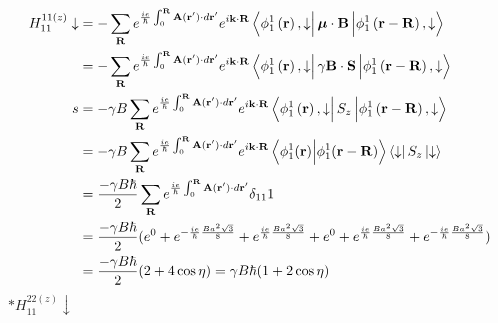 \documentclass{report}
\newcommand{\f}[2]{\dfrac{#1}{#2}}
\begin{document}
\begin{align*}
	H_{11}^{11(z)} \downarrow & = - \sum_{\mathbf{R}} e^{\frac{ie}{\hbar}\int_0^{\mathbf{R}}\mathbf{A}(\mathbf{r'})\cdot d\mathbf{r'}}e^{i\mathbf{k\cdot R}} \bra{\phi^{1}_{1} \left(\mathbf{r}\right), \downarrow} \boldsymbol{\mu}\cdot \mathbf{B} \ket{\phi^{1}_{1} \left(\mathbf{r - R}\right) ,\downarrow} \\
	                          & = - \sum_{\mathbf{R}} e^{\frac{ie}{\hbar}\int_0^{\mathbf{R}}\mathbf{A}(\mathbf{r'})\cdot d\mathbf{r'}}e^{i\mathbf{k\cdot R}} \bra{\phi^{1}_{1} \left(\mathbf{r}\right) ,\downarrow} \gamma \mathbf{B}\cdot\mathbf{S} \ket{\phi^{1}_{1} \left(\mathbf{r - R}\right) ,\downarrow} \\s
	                          & = -\gamma B \sum_{\mathbf{R}} e^{\frac{ie}{\hbar}\int_0^{\mathbf{R}}\mathbf{A}(\mathbf{r'})\cdot d\mathbf{r'}}e^{i\mathbf{k\cdot R}} \bra{\phi^{1}_{1} \left(\mathbf{r}\right) ,\downarrow} S_z \ket{\phi^{1}_{1} \left(\mathbf{r-R}\right) ,\downarrow}                        \\
	                          & = -\gamma B \sum_{\mathbf{R}} e^{\frac{ie}{\hbar}\int_0^{\mathbf{R}}\mathbf{A}(\mathbf{r'})\cdot d\mathbf{r'}}e^{i\mathbf{k\cdot R}} \bra{\phi_{1}^{1}(\mathbf{r})} \ket{\phi_{1}^{1}(\mathbf{r-R}) }\bra{\downarrow}S_z\ket{\downarrow}                                        \\
	                          & = \f{ -\gamma B\hbar}{2} \sum_{\mathbf{R}} e^{\frac{ie}{\hbar}\int_0^{\mathbf{R}}\mathbf{A}(\mathbf{r'})\cdot d\mathbf{r'}} \delta_{11} 1                                                                                                                                       \\
	                          & = \f{ -\gamma B\hbar}{2} (e^{0} + e^{-\frac{ie}{\hbar}\frac{Ba^2\sqrt{3}}{8}} + e^{\frac{ie}{\hbar}\frac{Ba^2\sqrt{3}}{8}} + e^{0} +
	e^{\frac{ie}{\hbar}\frac{Ba^2\sqrt{3}}{8}}
	+ e^{-\frac{ie}{\hbar}\frac{Ba^2\sqrt{3}}{8}} )                                                                                                                                                                                                                                                             \\
	                          & = \f{-\gamma B\hbar}{2} (2 + 4\cos\eta)  = \gamma B\hbar(1+2\cos\eta)
\end{align*}
$\ast H_{11}^{22(z)} \downarrow$
\end{document}
